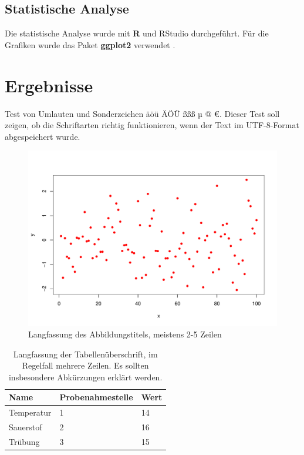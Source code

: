 \documentclass[english,ngerman,BCOR=6mm,cdgeometry=no,DIV=13]{tudscrreprt}
\begin{document}
\section{Statistische Analyse}

Die statistische Analyse wurde mit \textbf{R} \parencite{r-core-2024} und RStudio
\parencite{rstudio-2024} durchgeführt. Für die Grafiken
wurde das Paket \textbf{ggplot2} verwendet \parencite{wickham-ggplot2-2016}.


\chapter{Ergebnisse}

Test von Umlauten und Sonderzeichen äöü ÄÖÜ ßßß µ @ €. Dieser Test soll zeigen,
ob die Schriftarten richtig funktionieren, wenn der Text im UTF-8-Format
abgespeichert wurde.

\begin{figure}
	\centering
	\includegraphics[width=\textwidth]{pdf-plot.pdf}
	\caption[Kurzfassung des Abbildungstitels]{Langfassung des Abbildungstitels,
	         meistens 2-5 Zeilen}\label{fig:fig_1}
\end{figure}

\begin{table}
	\centering
	\caption[Kurzfassung der Tabellenüberschrft]{Langfassung der Tabellenüberschrift,
	        im Regelfall mehrere Zeilen. Es sollten insbesondere Abkürzungen erklärt werden.}
	\label{tab:my_label}
	\begin{tabular}{lll}\hline
		Name & Probenahmestelle & Wert\\\hline
		Temperatur & 1  & 14  \\
		Sauerstof & 2  & 16 \\
		Trübung & 3 & 15 \\ \hline
	\end{tabular}
\end{table}
\end{document}
